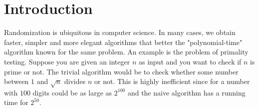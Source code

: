 \chapter{Introduction}

Randomization is ubiquitous in computer science. In many cases, we obtain faster, simpler and more elegant algorithms that better the "polynomial-time" algorithm known for the same problem. An example is the problem of primality testing. Suppose you are given an integer $n$ as input and you want to check if $n$ is prime or not. The trivial algorithm would be to check whether  some number between $1$ and $\sqrt{n}$ divides $n$ or not. This is highly inefficient since for a number with $100$ digits could be as large as $2^{100}$ and the naive algorithm has a running time for $2^{50}$.
